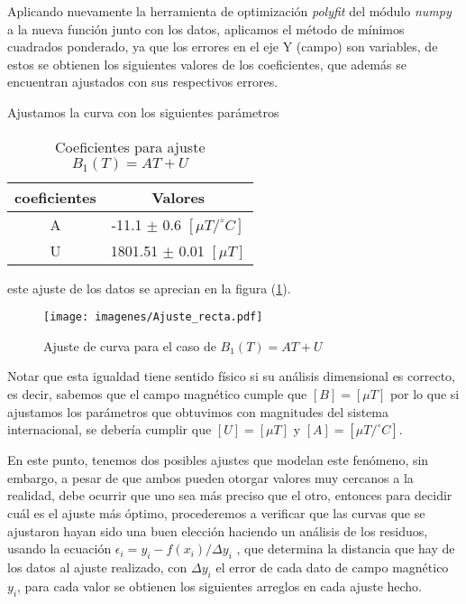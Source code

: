 Aplicando nuevamente la herramienta de optimización \emph{polyfit} del  módulo \emph{numpy} a  la  nueva  función junto con los datos, aplicamos el método de mínimos cuadrados ponderado, ya que los errores en el eje Y (campo) son variables, de estos se obtienen los siguientes valores de los coeficientes, que además se encuentran ajustados con sus respectivos errores.

Ajustamos la curva con los siguientes parámetros
\begin{table}[!h]
    \centering
    \begin{tabular}{|c|c|}
      \hline
      coeficientes      & Valores \\
      \hline
      A       &   -11.1 $\pm$ 0.6 $[\mu T/^\circ C]$\\
      \hline
      U  & 1801.51 $\pm $ 0.01 $[\mu T]$\\
      \hline
    
    \end{tabular}
    \caption{Coeficientes para ajuste $B_1(T)=AT+U $}
    \label{param-recta}
\end{table}
este ajuste de los datos se aprecian en la figura (\ref{Ajuste-recta}).


\begin{figure}[h!]
    \centering
    \texttt{[image: imagenes/Ajuste\_recta.pdf]}
    \caption{Ajuste de curva para el caso de $B_1(T)=A T+U $}
    \label{Ajuste-recta}
\end{figure}


Notar que esta igualdad tiene sentido físico si su análisis dimensional es correcto, es decir, sabemos que el campo magnético cumple que $[B]=[\mu T]$  por lo que si ajustamos los parámetros que obtuvimos con magnitudes del sistema internacional, se debería cumplir que  $[U]=[\mu T]$ y $[A]=[\mu T/^\circ C]$.

En este punto, tenemos dos posibles ajustes que modelan este fenómeno, sin embargo, a pesar de que ambos pueden otorgar valores muy cercanos a la realidad, debe ocurrir que uno sea más preciso que el otro, entonces para decidir cuál es el ajuste más óptimo, procederemos a verificar que las curvas que se ajustaron hayan sido una buen elección haciendo un análisis de los residuos, usando la ecuación $\epsilon_i= y_i - f(x_i)/\Delta y_i$ , que determina la distancia que hay de los datos al ajuste realizado, con $\Delta y_i$ el error de cada dato de campo magnético $y_i$, para cada valor se obtienen los siguientes arreglos en cada ajuste hecho.\\



